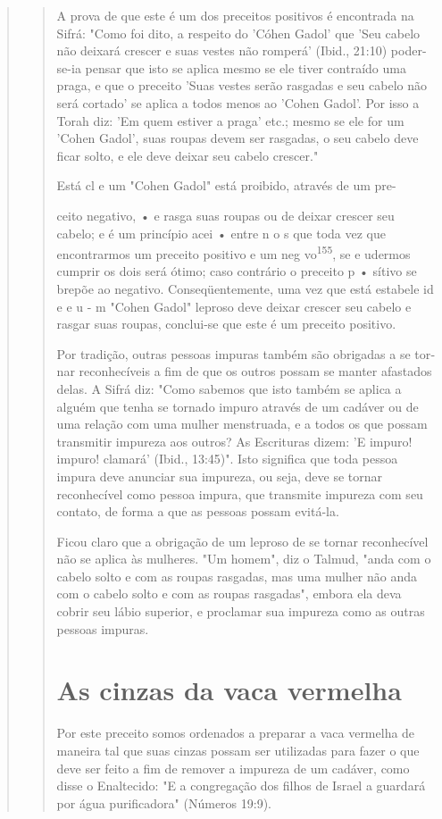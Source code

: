 \begin{quote}
\begin{quote}
A prova de que este é um dos preceitos positivos é encontrada na Sifrá:
"Como foi dito, a respeito do 'Cóhen Gadol' que 'Seu cabelo não deixará
crescer e suas vestes não romperá' (Ibid., 21:10) poder-se-ia pensar que
isto se aplica mesmo se ele tiver contraído uma praga, e que o preceito
'Suas vestes serão rasgadas e seu cabelo não será cortado' se aplica a
todos menos ao 'Co­hen Gadol'. Por isso a Torah diz: 'Em quem estiver a
praga' etc.; mesmo se ele for um 'Cohen Gadol', suas roupas devem ser
rasgadas, o seu cabelo deve ficar solto, e ele deve deixar seu cabelo
crescer."

Está cl e um "Cohen Gadol" está proibido, através de um pre-

ceito negativo, • e rasga suas roupas ou de deixar crescer seu cabelo; e
é um princípio acei • entre n o s que toda vez que encontrarmos um
preceito positi­vo e um neg vo\textsuperscript{155}, se e udermos
cumprir os dois será ótimo; caso contrário o preceito p • sítivo se
brepõe ao negativo. Conseqüentemente, uma vez que está estabele id e e u
- m "Cohen Gadol" leproso deve deixar crescer seu ca­belo e rasgar suas
roupas, conclui-se que este é um preceito positivo.

Por tradição, outras pessoas impuras também são obrigadas a se tor­nar
reconhecíveis a fim de que os outros possam se manter afastados delas. A
Sifrá diz: "Como sabemos que isto também se aplica a alguém que tenha se
tor­nado impuro através de um cadáver ou de uma relação com uma mulher
mens­truada, e a todos os que possam transmitir impureza aos outros? As
Escrituras dizem: 'E impuro! impuro! clamará' (Ibid., 13:45)". Isto
significa que toda pes­soa impura deve anunciar sua impureza, ou seja,
deve se tornar reconhecível como pessoa impura, que transmite impureza
com seu contato, de forma a que as pessoas possam evitá-la.

Ficou claro que a obrigação de um leproso de se tornar reconhecí­vel não
se aplica às mulheres. "Um homem", diz o Talmud, "anda com o cabe­lo
solto e com as roupas rasgadas, mas uma mulher não anda com o cabelo
sol­to e com as roupas rasgadas", embora ela deva cobrir seu lábio
superior, e pro­clamar sua impureza como as outras pessoas impuras.

\section{As cinzas da vaca vermelha}

Por este preceito somos ordenados a preparar a vaca vermelha de maneira
tal que suas cinzas possam ser utilizadas para fazer o que deve ser
feito a fim de remover a impureza de um cadáver, como disse o
Enaltecido: "E a congregação dos filhos de Israel a guardará por água
purificadora" (Números 19:9).


\end{quote}
\end{quote}

